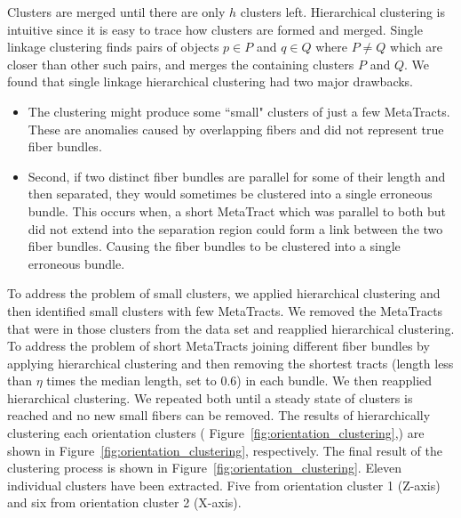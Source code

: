 Clusters are merged until there are only $h$ clusters left.
Hierarchical clustering is intuitive since it is easy to trace how clusters are formed and merged.
Single linkage clustering finds pairs of objects $p \in P$ and $q \in Q$ where $P \neq Q$ which are closer than other such pairs, and merges the containing clusters $P$ and $Q$.
We found that single linkage hierarchical clustering had two major drawbacks.
\begin{itemize}
	\item The clustering might produce some ``small" clusters of just a few MetaTracts.
	These \mt are anomalies caused by overlapping fibers and did not represent true fiber bundles.
	\item Second, if two distinct fiber bundles are parallel for some of their length and then separated, they would sometimes be clustered into a single erroneous bundle.
	This occurs when, a short MetaTract which was parallel to both but did not extend into the separation region could form a link between the two fiber bundles. Causing the fiber bundles to be clustered into a single erroneous bundle.
\end{itemize}

To address the problem of small clusters, we applied hierarchical clustering and then identified small clusters with few MetaTracts.
We removed the MetaTracts that were in those clusters from the data set and reapplied hierarchical clustering.
To address the problem of short MetaTracts joining different fiber bundles by applying hierarchical clustering and then removing the
shortest tracts (length less than $\eta$ times the median length, set to 0.6) in each bundle. We then reapplied hierarchical clustering.
We repeated both until a steady state of clusters is reached and no new small fibers can be removed. The results of hierarchically clustering each orientation clusters ( Figure~\ref{fig:orientation_clustering},) are shown in Figure~\ref{fig:orientation_clustering}, respectively. The final result of the clustering process is shown in Figure~\ref{fig:orientation_clustering}. Eleven individual clusters have been extracted. Five from orientation cluster 1 (Z-axis) and six from orientation cluster 2 (X-axis).  
